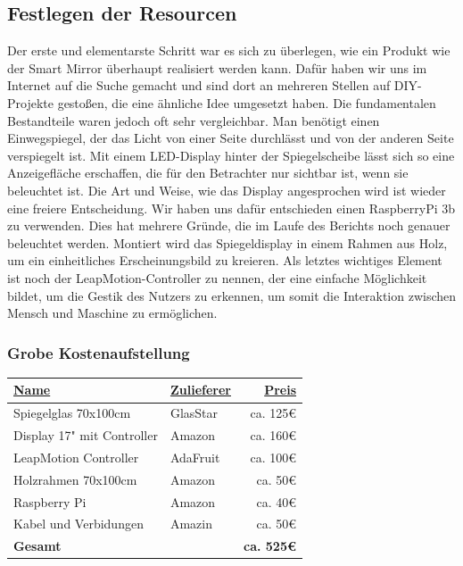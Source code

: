 \documentclass[12pt, a4paper]{scrartcl}
\begin{document}
	\subsection{Festlegen der Resourcen}
	Der erste und elementarste Schritt war es sich zu überlegen, wie ein Produkt wie der Smart Mirror überhaupt realisiert werden kann. Dafür haben wir uns im Internet auf die Suche gemacht und sind dort an mehreren Stellen auf DIY-Projekte gestoßen, die eine ähnliche Idee umgesetzt haben. Die fundamentalen Bestandteile waren jedoch oft sehr vergleichbar. Man benötigt einen Einwegspiegel, der das Licht von einer Seite durchlässt und von der anderen Seite verspiegelt ist. Mit einem LED-Display hinter der Spiegelscheibe lässt sich so eine Anzeigefläche erschaffen, die für den Betrachter nur sichtbar ist, wenn sie beleuchtet ist. Die Art und Weise, wie das Display angesprochen wird ist wieder eine freiere Entscheidung. Wir haben uns dafür entschieden einen RaspberryPi 3b zu verwenden. Dies hat mehrere Gründe, die im Laufe des Berichts noch genauer beleuchtet werden. Montiert wird das Spiegeldisplay in einem Rahmen aus Holz, um ein einheitliches Erscheinungsbild zu kreieren. Als letztes wichtiges Element ist noch der LeapMotion-Controller zu nennen, der eine einfache Möglichkeit bildet, um die Gestik des Nutzers zu erkennen, um somit die Interaktion zwischen Mensch und Maschine zu ermöglichen.
	\subsubsection*{Grobe Kostenaufstellung}
	\begin{tabularx}{0.95\textwidth}{|X|l|r|}
		\hline
		\textcolor{tumbleweed}{\underline{\textbf{Name}}} & \textcolor{tumbleweed}{\underline{\textbf{Zulieferer}}} & \textcolor{tumbleweed}{\underline{\textbf{Preis}}}\\
		\hline
		Spiegelglas 70x100cm & GlasStar&ca. 125\euro\\
		\hline
		Display 17" mit Controller & Amazon & ca. 160\euro\\
		\hline
		LeapMotion Controller & AdaFruit & ca. 100\euro \\
		\hline
		Holzrahmen 70x100cm & Amazon & ca. 50\euro\\
		\hline
		Raspberry Pi & Amazon & ca. 40\euro\\
		\hline
		Kabel und Verbidungen & Amazin & ca. 50\euro\\
		\hline
		\textcolor{tumbleweed}{\textbf{Gesamt}}& & \textbf{ca. 525\euro}\\
		\hline
	\end{tabularx}
\end{document}
